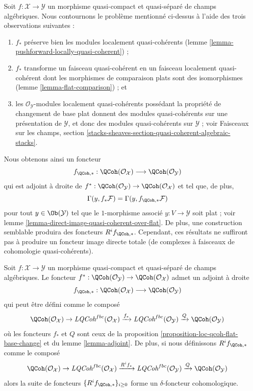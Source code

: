 \medskip\noindent
Soit $f : \mathcal{X} \to \mathcal{Y}$ un morphisme quasi-compact et
quasi-séparé de champs algébriques. Nous contournons le problème
mentionné ci-dessus à l'aide des trois observations suivantes :
\begin{enumerate}
\item $f_*$ préserve bien les modules localement quasi-cohérents
(lemme \ref{lemma-pushforward-locally-quasi-coherent}) ;
\item $f_*$ transforme un faisceau quasi-cohérent en un faisceau localement quasi-cohérent
dont les morphismes de comparaison plats sont des isomorphismes
(lemme \ref{lemma-flat-comparison}) ; et
\item les $\mathcal{O}_\mathcal{Y}$-modules localement quasi-cohérents
possédant la propriété de changement de base plat donnent des modules quasi-cohérents
sur une présentation de $\mathcal{Y}$, et donc des modules quasi-cohérents
sur $\mathcal{Y}$ ; voir
Faisceaux sur les champs, section
\ref{stacks-sheaves-section-quasi-coherent-algebraic-stacks}.
\end{enumerate}
Nous obtenons ainsi un foncteur
$$
f_{\QCoh, *} :
\QCoh(\mathcal{O}_\mathcal{X})
\longrightarrow
\QCoh(\mathcal{O}_\mathcal{Y})
$$
qui est adjoint à droite de
$f^* : \QCoh(\mathcal{O}_\mathcal{Y}) \to
\QCoh(\mathcal{O}_\mathcal{X})$
et tel que, de plus,
$$
\Gamma(y, f_*\mathcal{F}) = \Gamma(y, f_{\QCoh, *}\mathcal{F})
$$
pour tout $y \in \Ob(\mathcal{Y})$ tel que le $1$-morphisme
associé $y : V \to \mathcal{Y}$ soit plat ; voir
lemme \ref{lemma-direct-image-quasi-coherent-over-flat}.
De plus, une construction semblable produira des foncteurs
$R^if_{\QCoh, *}$.
Cependant, ces résultats ne suffiront pas à produire un foncteur
image directe totale (de complexes à faisceaux de cohomologie
quasi-cohérents).

\begin{proposition}
\label{proposition-direct-image-quasi-coherent}
Soit $f : \mathcal{X} \to \mathcal{Y}$ un morphisme quasi-compact et quasi-séparé
de champs algébriques. Le foncteur
$f^* : \QCoh(\mathcal{O}_\mathcal{Y}) \to
\QCoh(\mathcal{O}_\mathcal{X})$
admet un adjoint à droite
$$
f_{\QCoh, *} :
\QCoh(\mathcal{O}_\mathcal{X})
\longrightarrow
\QCoh(\mathcal{O}_\mathcal{Y})
$$
qui peut être défini comme le composé
$$
\QCoh(\mathcal{O}_\mathcal{X}) \to
\textit{LQCoh}^{fbc}(\mathcal{O}_\mathcal{X})
\xrightarrow{f_*} \textit{LQCoh}^{fbc}(\mathcal{O}_\mathcal{Y})
\xrightarrow{Q} \QCoh(\mathcal{O}_\mathcal{Y})
$$
où les foncteurs $f_*$ et $Q$ sont ceux de la
proposition \ref{proposition-loc-qcoh-flat-base-change}
et du
lemme \ref{lemma-adjoint}.
De plus, si nous définissons $R^if_{\QCoh, *}$ comme le composé
$$
\QCoh(\mathcal{O}_\mathcal{X}) \to
\textit{LQCoh}^{fbc}(\mathcal{O}_\mathcal{X})
\xrightarrow{R^if_*} \textit{LQCoh}^{fbc}(\mathcal{O}_\mathcal{Y})
\xrightarrow{Q} \QCoh(\mathcal{O}_\mathcal{Y})
$$
alors la suite de foncteurs $\{R^if_{\QCoh, *}\}_{i \geq 0}$
forme un $\delta$-foncteur cohomologique.
\end{proposition}

